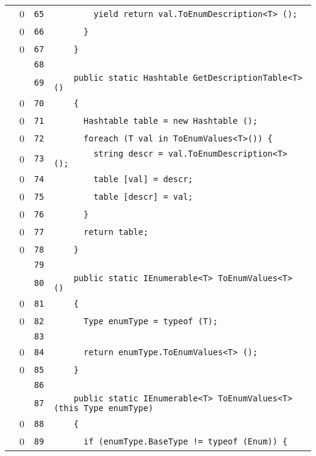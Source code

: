 \documentclass[a4paper,10pt]{article}
\begin{document}
\begin{longtable}[l]{lrrl}
\cellcolor{red} & 0 & \verb~65~ & \verb~        yield return val.ToEnumDescription<T> ();~\\
\cellcolor{red} & 0 & \verb~66~ & \verb~      }~\\
\cellcolor{red} & 0 & \verb~67~ & \verb~    }~\\
\cellcolor{gray} &  & \verb~68~ & \verb~~\\
\cellcolor{gray} &  & \verb~69~ & \verb~    public static Hashtable GetDescriptionTable<T> ()~\\
\cellcolor{red} & 0 & \verb~70~ & \verb~    {~\\
\cellcolor{red} & 0 & \verb~71~ & \verb~      Hashtable table = new Hashtable ();~\\
\cellcolor{red} & 0 & \verb~72~ & \verb~      foreach (T val in ToEnumValues<T>()) {~\\
\cellcolor{red} & 0 & \verb~73~ & \verb~        string descr = val.ToEnumDescription<T> ();~\\
\cellcolor{red} & 0 & \verb~74~ & \verb~        table [val] = descr;~\\
\cellcolor{red} & 0 & \verb~75~ & \verb~        table [descr] = val;~\\
\cellcolor{red} & 0 & \verb~76~ & \verb~      }~\\
\cellcolor{red} & 0 & \verb~77~ & \verb~      return table;~\\
\cellcolor{red} & 0 & \verb~78~ & \verb~    }~\\
\cellcolor{gray} &  & \verb~79~ & \verb~~\\
\cellcolor{gray} &  & \verb~80~ & \verb~    public static IEnumerable<T> ToEnumValues<T> ()~\\
\cellcolor{red} & 0 & \verb~81~ & \verb~    {~\\
\cellcolor{red} & 0 & \verb~82~ & \verb~      Type enumType = typeof (T);~\\
\cellcolor{gray} &  & \verb~83~ & \verb~~\\
\cellcolor{red} & 0 & \verb~84~ & \verb~      return enumType.ToEnumValues<T> ();~\\
\cellcolor{red} & 0 & \verb~85~ & \verb~    }~\\
\cellcolor{gray} &  & \verb~86~ & \verb~~\\
\cellcolor{gray} &  & \verb~87~ & \verb~    public static IEnumerable<T> ToEnumValues<T> (this Type enumType)~\\
\cellcolor{red} & 0 & \verb~88~ & \verb~    {~\\
\cellcolor{red} & 0 & \verb~89~ & \verb~      if (enumType.BaseType != typeof (Enum)) {~\\

\end{longtable}
\end{document}
